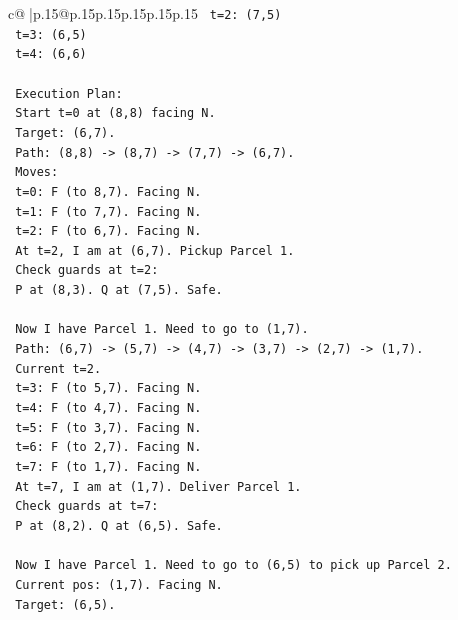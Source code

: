 \documentclass{article}
\begin{document}
{\begin{supertabular}{c@{$\;$}|p{.15\linewidth}@{}p{.15\linewidth}p{.15\linewidth}p{.15\linewidth}p{.15\linewidth}p{.15\linewidth}}
{{{\texttt{         t=2: (7,5)} \\
\texttt{         t=3: (6,5)} \\
\texttt{         t=4: (6,6)} \\
\\ 
\texttt{         Execution Plan:} \\
\texttt{         Start t=0 at (8,8) facing N.} \\
\texttt{         Target: (6,7).} \\
\texttt{         Path: (8,8) {-}> (8,7) {-}> (7,7) {-}> (6,7).} \\
\texttt{         Moves:} \\
\texttt{         t=0: F (to 8,7). Facing N.} \\
\texttt{         t=1: F (to 7,7). Facing N.} \\
\texttt{         t=2: F (to 6,7). Facing N.} \\
\texttt{         At t=2, I am at (6,7). Pickup Parcel 1.} \\
\texttt{         Check guards at t=2:} \\
\texttt{         P at (8,3). Q at (7,5). Safe.} \\
\\ 
\texttt{         Now I have Parcel 1. Need to go to (1,7).} \\
\texttt{         Path: (6,7) {-}> (5,7) {-}> (4,7) {-}> (3,7) {-}> (2,7) {-}> (1,7).} \\
\texttt{         Current t=2.} \\
\texttt{         t=3: F (to 5,7). Facing N.} \\
\texttt{         t=4: F (to 4,7). Facing N.} \\
\texttt{         t=5: F (to 3,7). Facing N.} \\
\texttt{         t=6: F (to 2,7). Facing N.} \\
\texttt{         t=7: F (to 1,7). Facing N.} \\
\texttt{         At t=7, I am at (1,7). Deliver Parcel 1.} \\
\texttt{         Check guards at t=7:} \\
\texttt{         P at (8,2). Q at (6,5). Safe.} \\
\\ 
\texttt{         Now I have Parcel 1. Need to go to (6,5) to pick up Parcel 2.} \\
\texttt{         Current pos: (1,7). Facing N.} \\
\texttt{         Target: (6,5).} \\
}}}
\end{supertabular}}
\end{document}
